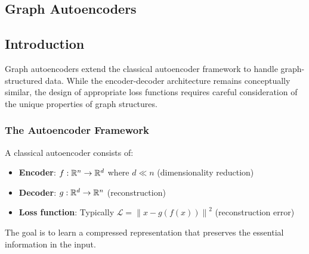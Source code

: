 \begin{notechapter}
\forgetcs\R{}
\forgetcs\norm\newcommand{\norm}[1]{\left\|#1\right\|}
\forgetcs\hadamard\newcommand{\hadamard}{\odot}
\chapter{Graph Autoencoders}\label{ch:graph-autoencoders}

\begin{abstract}
This document provides a comprehensive introduction to Graph Autoencoders, focusing on the mathematical foundations of the loss functions used in Structural Deep Network Embedding (SDNE). We develop the intuition behind why standard autoencoder approaches fail for graph structures, and explain in detail how the combined loss function addresses these challenges. Multiple concrete examples illustrate the mathematical concepts.
\end{abstract}

\section{Introduction}

Graph autoencoders extend the classical autoencoder framework to handle graph-structured data. While the encoder-decoder architecture remains conceptually similar, the design of appropriate loss functions requires careful consideration of the unique properties of graph structures.

\subsection{The Autoencoder Framework}

A classical autoencoder consists of:
\begin{itemize}
    \item \textbf{Encoder}: $f: \mathbb{R}^n \to \mathbb{R}^d$ where $d \ll n$ (dimensionality reduction)
    \item \textbf{Decoder}: $g: \mathbb{R}^d \to \mathbb{R}^n$ (reconstruction)
    \item \textbf{Loss function}: Typically $\mathcal{L} = \norm{x - g(f(x))}^2$ (reconstruction error)
\end{itemize}

The goal is to learn a compressed representation that preserves the essential information in the input.


\end{notechapter}
